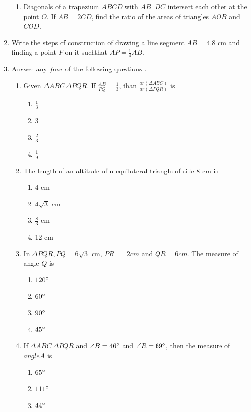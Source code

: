 \documentclass{article}
\begin{document}
\begin{enumerate}
\begin{enumerate}
			\item Diagonals of a trapezium $ ABCD $ with $ AB || DC $ intersect each other at the 
				point $ O $. If $ AB =2 CD $, find the ratio of the areas of triangles $ AOB $ 
				and $ COD $. 
		\end{enumerate}
	\item Write the steps of construction of drawing a line segment $ AB = 4.8 $ cm and finding a point 
		$ P $ on it suchthat $ AP = \frac{1}{4} AB $. 
	\item Answer any $ four $ of the following questions : 
		\begin{enumerate}
		\item Given $ \Delta ABC ~ \Delta PQR $. If $ \frac{AB}{PQ} = \frac{1}{3} $, than 
			$ \frac{ar(\Delta ABC)}{ar(\Delta PQR)} $ is
			\begin{enumerate}
			\item $ \frac{1}{3} $
			\item 3
			\item $ \frac{2}{3} $
			\item $ \frac{1}{9} $
			\end{enumerate}
		\item The length of an altitude of n equilateral triangle of side 8 cm is
			\begin{enumerate}
				\item 4 cm
				\item $ 4\sqrt{3} $ cm
				\item $ \frac{8}{3} $ cm
				\item 12 cm
			\end{enumerate}
		\item In $ \Delta PQR, PQ = 6 \sqrt{3} $ cm, $ PR = 12 cm $ and $ QR = 6 cm $. The measure of 
			angle $ Q $ is
			\begin{enumerate}
		\item $ 120{\degree} $
		\item $ 60{\degree} $
		\item $ 90{\degree} $
		\item $ 45{\degree} $
			\end{enumerate}
		\item If $ \Delta ABC ~ \Delta PQR $ and $ \angle{B} =46{\degree} $ and $ \angle{R} = 69{\degree}
			 $, then the measure of $ angle{A} $ is
				\begin{enumerate}
					\item $ 65{\degree} $
					\item $ 111{\degree} $
					\item $ 44{\degree} $

\end{enumerate}
\end{enumerate}
\end{enumerate}
\end{document}
